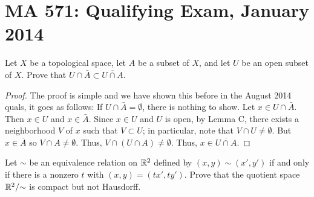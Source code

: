 \section{MA 571: Qualifying Exam, January 2014}
\begin{problem}
Let $X$ be a topological space, let $A$ be a subset of $X$, and let $U$ be
an open subset of $X$. Prove that $U\cap\bar A\subset\overline{U\cap A}$.
\end{problem}
\begin{proof}
The proof is simple and we have shown this before in the August 2014
quals, it goes as follows: If $U\cap\bar A=\emptyset$, there is nothing to
show. Let $x\in U\cap\bar A$. Then $x\in U$ and $x\in\bar A$. Since $x\in
U$ and $U$ is open, by Lemma C, there exists a neighborhood $V$ of $x$ such
that $V\subset U$; in particular, note that $V\cap U\neq\emptyset$. But
$x\in\bar A$ so $V\cap A\neq\emptyset$. Thus, $V\cap(U\cap
A)\neq\emptyset$. Thus, $x\in\overline{U\cap A}$.
\end{proof}
\begin{problem}
Let $\sim$ be an equivalence relation on $\mathbb{R}^2$ defined by
$(x,y)\sim(x',y')$ if and only if there is a nonzero $t$ with
$(x,y)=(tx',ty')$. Prove that the quotient space $\mathbb{R}^2/{\sim}$ is compact
but not Hausdorff.
\end{problem}
